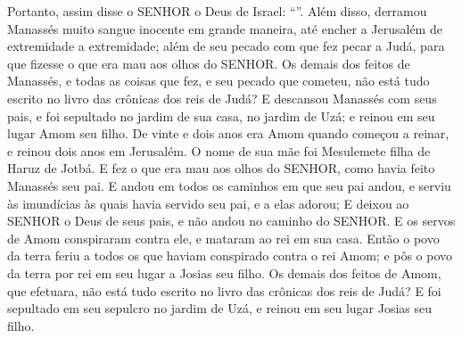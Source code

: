 {{{{  Portanto}}, assim disse o SENHOR o Deus de Israel: \enquote{}}.
  Além disso, derramou Manassés muito sangue inocente em grande maneira, até encher a Jerusalém de extremidade a extremidade; além de seu pecado com que fez pecar a Judá, para que fizesse o que era mau aos olhos do SENHOR.
  Os demais dos feitos de Manassés, e todas as coisas que fez, e seu pecado que cometeu, não está tudo escrito no livro das crônicas dos reis de Judá?
  E descansou Manassés com seus pais, e foi sepultado no jardim de sua casa, no jardim de Uzá; e reinou em seu lugar Amom seu filho.
  De vinte e dois anos era Amom quando começou a reinar, e reinou dois anos em Jerusalém. O nome de sua mãe foi Mesulemete filha de Haruz de Jotbá.
  E fez o que era mau aos olhos do SENHOR, como havia feito Manassés seu pai.
  E andou em todos os caminhos em que seu pai andou, e serviu às imundícias às quais havia servido seu pai, e a elas adorou;
  E deixou ao SENHOR o Deus de seus pais, e não andou no caminho do SENHOR.
  E os servos de Amom conspiraram contra ele, e mataram ao rei em sua casa.
  Então o povo da terra feriu a todos os que haviam conspirado contra o rei Amom; e pôs o povo da terra por rei em seu lugar a Josias seu filho.
  Os demais dos feitos de Amom, que efetuara, não está tudo escrito no livro das crônicas dos reis de Judá?
  E foi sepultado em seu sepulcro no jardim de Uzá, e reinou em seu lugar Josias seu filho.
\par }

